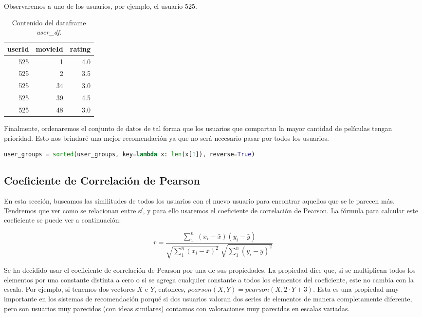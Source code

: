 \documentclass{uimppracticas}
\begin{document}
Observaremos a uno de los usuarios, por ejemplo, el usuario 525.

\begin{table}[h]
	\centering
	\begin{tabular}{rrr}
		\toprule
		userId &  movieId &  rating \\
		\midrule
		525 &        1 &     4.0 \\
		525 &        2 &     3.5 \\
		525 &       34 &     3.0 \\
		525 &       39 &     4.5 \\
		525 &       48 &     3.0 \\
		\bottomrule
	\end{tabular}
	\caption{Contenido del dataframe \textit{user\_df}.}
	\label{user_525}
\end{table}

Finalmente, ordenaremos el conjunto de datos de tal forma que los usuarios que compartan la mayor cantidad de películas tengan prioridad. Esto nos brindaré una mejor recomendación ya que no será necesario pasar por todos los usuarios. 

\begin{lstlisting}[language=python]
user_groups = sorted(user_groups, key=lambda x: len(x[1]), reverse=True)
\end{lstlisting}

\subsection{Coeficiente de Correlación de Pearson}\label{correlacion_pearson}

En esta sección, buscamos las similitudes de todos los usuarios con el nuevo usuario para encontrar aquellos que se le parecen más. Tendremos que ver como se relacionan entre sí, y para ello usaremos el \href{https://es.wikipedia.org/wiki/Coeficiente_de_correlaci\%C3\%B3n_de_Pearson}{coeficiente de correlación de Pearson}. La fórmula para calcular este coeficiente se puede ver a continuación:

\begin{equation}\label{formula}
	r = \frac{\sum_{1}^{n} \; (x_{i} - \bar{x}) (y_{i} - \bar{y})}{\sqrt{\sum_{1}^{n}(x_{i} - \bar{x})^2} \; \sqrt{\sum_{1}^{n}(y_{i} - \bar{y})^2}}
\end{equation}

Se ha decidido usar el coeficiente de correlación de Pearson por una de sus propiedades. La propiedad dice que, si se multiplican todos los elementos por una constante distinta a cero o si se agrega cualquier constante a todos los elementos del coeficiente, este no cambia con la escala. Por ejemplo, si tenemos dos vectores $X$ e $Y$, entonces, $pearson(X,Y) = pearson(X,2\cdot Y+3)$. Esta es una propiedad muy importante en los sistemas de recomendación porqué si dos usuarios valoran dos series de elementos de manera completamente diferente, pero son usuarios muy parecidos (con ideas similares) contamos con valoraciones muy parecidas en escalas variadas.
\end{document}
